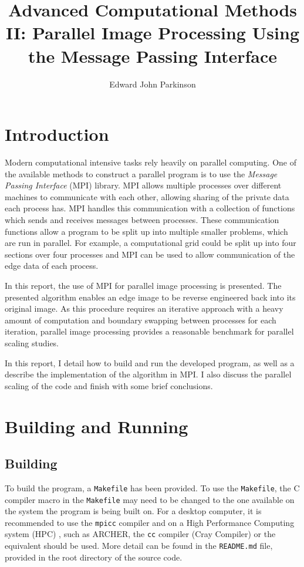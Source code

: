\documentclass[11pt, a4paper]{article}
\begin{document}
	\title{Advanced Computational Methods II: Parallel Image Processing Using the Message Passing Interface}
	\author{Edward John Parkinson}
	\maketitle	
	
	\section{Introduction}
		Modern computational intensive tasks rely heavily on parallel computing. One of the available methods to construct a parallel program is to use the \textit{Message Passing Interface} (MPI) library. MPI allows multiple processes over different machines to communicate with each other, allowing sharing of the private data each process has. MPI handles this communication with a collection of functions which sends and receives messages between processes. These communication functions allow a program to be split up into multiple smaller problems, which are run in parallel. For example, a computational grid could be split up into four sections over four processes and MPI can be used to allow communication of the edge data of each process. 
		
		In this report, the use of MPI for parallel image processing is presented. The presented algorithm enables an edge image to be reverse engineered back into its original image. As this procedure requires an iterative approach with a heavy amount of computation and boundary swapping between processes for each iteration, parallel image processing provides a reasonable benchmark for parallel scaling studies.
		
		In this report, I detail how to build and run the developed program, as well as a describe the implementation of the algorithm in MPI. I  also discuss the parallel scaling of the code and finish with some brief conclusions.
	
	\section{Building and Running}
		\subsection{Building}
			To build the program, a \texttt{Makefile} has been provided. To use the \texttt{Makefile}, the C compiler macro in the \texttt{Makefile} may need to be changed to the one available on the system the program is being built on. For a desktop computer, it is recommended to use the \texttt{mpicc} compiler and on a High Performance Computing system (HPC) , such as ARCHER, the \texttt{cc} compiler (Cray Compiler) or the equivalent should be used. More detail can be found in the \texttt{README.md} file, provided in the root directory of the source code.
		
\end{document}
